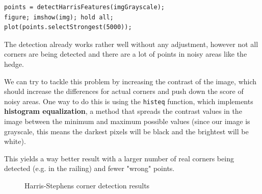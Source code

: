\documentclass{Configuration_Files/PoliMi3i_thesis}
\begin{document}
\begin{verbatim}
points = detectHarrisFeatures(imgGrayscale);
figure; imshow(img); hold all;
plot(points.selectStrongest(5000));
\end{verbatim}
\newpage

The detection already works rather well without any adjustment, however not all corners are being detected and there are a lot of points in noisy areas like the hedge.

We can try to tackle this problem by increasing the contrast of the image, which should increase the differences for actual corners and push down the score of noisy areas.
One way to do this is using the \verb|histeq| function, which implements \textbf{histogram equalization}, a method that spreads the contrast values in the image between the minimum and maximum possible values (since our image is grayscale, this means the darkest pixels will be black and the brightest will be white).

This yields a way better result with a larger number of real corners being detected (e.g. in the railing) and fewer "wrong" points.

\begin{figure}[H]
    \centering
    \quad
    \caption{Harris-Stephens corner detection results}
    \label{fig:f1_harris}
\end{figure}
\end{document}
